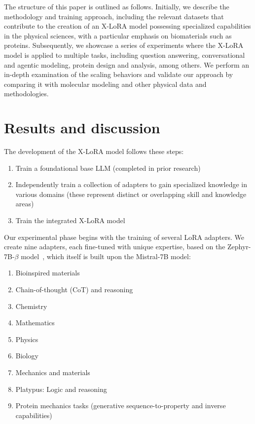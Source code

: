 The structure of this paper is outlined as follows. Initially, we describe the methodology and training approach, including the relevant datasets that contribute to the creation of an X-LoRA model possessing specialized capabilities in the physical sciences, with a particular emphasis on biomaterials such as proteins. Subsequently, we showcase a series of experiments where the X-LoRA model is applied to multiple tasks, including question answering, conversational and agentic modeling, protein design and analysis, among others. We perform an in-depth examination of the scaling behaviors and validate our approach by comparing it with molecular modeling and other physical data and methodologies.

\section{Results and discussion}

The development of the X-LoRA model follows these steps:

\begin{enumerate}
    \item Train a foundational base LLM (completed in prior research) \item Independently train a collection of adapters to gain specialized knowledge in various domains (these represent distinct or overlapping skill and knowledge areas) \item Train the integrated X-LoRA model
\end{enumerate}

Our experimental phase begins with the training of several LoRA adapters. We create nine adapters, each fine-tuned with unique expertise, based on the Zephyr-7B-$\beta$ model~\cite{HuggingFaceH4/zephyr-7b-betaFace}, which itself is built upon the Mistral-7B model\cite{Jiang2023Mistral7B}:

\begin{enumerate}
    \item Bioinspired materials \item Chain-of-thought (CoT) and reasoning \item Chemistry \item Mathematics \item Physics \item Biology \item Mechanics and materials \item Platypus: Logic and reasoning \item Protein mechanics tasks (generative sequence-to-property and inverse capabilities)
\end{enumerate}

